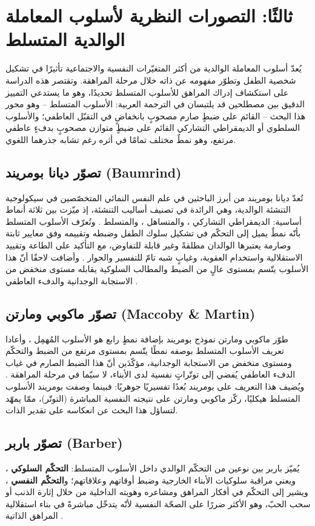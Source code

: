 \section{ثالثًا: التصورات النظرية لأسلوب المعاملة الوالدية المتسلط}
يُعدّ أسلوب المعاملة الوالدية من أكثر المتغيّرات النفسية والاجتماعية تأثيرًا في تشكيل شخصية الطفل
وتطوّر مفهومه عن ذاته خلال مرحلة المراهقة. وتقتصر هذه الدراسة على استكشاف إدراك المراهق للأسلوب
المتسلط تحديدًا، وهو ما يستدعي التمييز الدقيق بين مصطلحين قد يلتبسان في الترجمة العربية: الأسلوب
المتسلط  -- وهو محور هذا البحث -- القائم على ضبطٍ صارم مصحوبٍ بانخفاضٍ في
التقبّل العاطفي؛ والأسلوب السلطوي أو الديمقراطي التشاركي  القائم على ضبطٍ
متوازن مصحوبٍ بدفءٍ عاطفي مرتفع، وهو نمطٌ مختلف تمامًا في أثره رغم تشابه جذرهما اللغوي.

\subsection{تصوّر ديانا بومريند (Baumrind)}
تُعدّ ديانا بومريند من أبرز الباحثين في علم النفس النمائي المتخصّصين في سيكولوجية التنشئة الوالدية،
وهي الرائدة في تصنيف أساليب التنشئة، إذ ميّزت بين ثلاثة أنماط أساسية: الديمقراطي التشاركي
، والمتساهل ، والمتسلط . وتُعرّف الأسلوب
المتسلط بأنّه نمطٌ يميل إلى التحكّم في تشكيل سلوك الطفل وضبطه وتقييمه وفق معايير ثابتة وصارمة
يعتبرها الوالدان مطلقةً وغير قابلة للتفاوض، مع التأكيد على الطاعة وتقييد الاستقلالية واستخدام العقوبة،
وغيابٍ شبه تامّ للتفسير والحوار . وأضافت لاحقًا أنّ هذا الأسلوب يتّسم بمستوى
عالٍ من الضبط والمطالب السلوكية يقابله مستوى منخفض من الاستجابة الوجدانية والدفء العاطفي
.

\subsection{تصوّر ماكوبي ومارتن (Maccoby \& Martin)}
طوّر ماكوبي ومارتن نموذج بومريند بإضافة نمطٍ رابع هو الأسلوب المُهمِل ، وأعادا
تعريف الأسلوب المتسلط بوصفه نمطًا يتّسم بمستوى مرتفع من الضبط والتحكّم ومستوى منخفض من
الاستجابة الوجدانية، مؤكّدَين أنّ هذا الضبط الصارم في غياب الدفء العاطفي يُفضي إلى توتّراتٍ نفسية
لدى الأبناء، لا سيّما في مرحلة المراهقة . ويُضيف هذا التعريف على
بومريند بُعدًا تفسيريًا جوهريًا: فبينما وصفت بومريند الأسلوب المتسلط هيكليًا، ركّز ماكوبي ومارتن على
نتيجته النفسية المباشرة (التوتّر)، ممّا يمهّد لتساؤل هذا البحث عن انعكاسه على تقدير الذات.

\subsection{تصوّر باربر (Barber)}
يُميّز باربر بين نوعين من التحكّم الوالدي داخل الأسلوب المتسلط: \textbf{التحكّم السلوكي}
، ويعني مراقبة سلوكيات الأبناء الخارجية وضبط أوقاتهم وعلاقاتهم؛
و\textbf{التحكّم النفسي} ، ويشير إلى التحكّم في أفكار المراهق ومشاعره
وهويته الداخلية من خلال إثارة الذنب أو سحب الحبّ، وهو الأكثر ضررًا على الصحّة النفسية لأنّه يتدخّل
مباشرةً في بناء استقلالية المراهق الذاتية .

